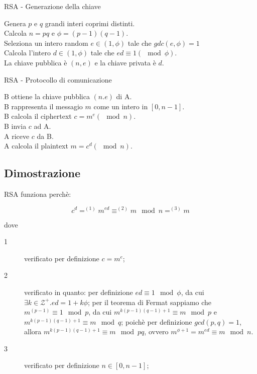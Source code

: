 \bigskip
\begin{algorithm}[H]
  \caption{RSA - Generazione della chiave}
  \label{alg:rsa-key-generation}
  \SetAlgoNoLine
  Genera $p$ e $q$ grandi interi coprimi distinti.\\
  Calcola $n=pq$ e $\phi=(p-1)(q-1)$.\\
  Seleziona un intero random $e \in (1,\phi)$ tale che $gdc(e,\phi)=1$\\
  Calcola l'intero $d \in (1,\phi)$ tale che $ed\equiv 1 (\mod \phi)$.\\
  La chiave pubblica è $(n,e)$ e la chiave privata è $d$.\\
\end{algorithm}

\bigskip
\begin{algorithm}[H]
  \SetAlgoNoLine
  \caption{RSA - Protocollo di comunicazione}
  \label{alg:rsa-protocol}
  B ottiene la chiave pubblica $(n.e)$ di A. \\
  B rappresenta il messagio $m$ come un intero in $[0,n-1]$. \\
  B calcola il ciphertext $c=m^{e}(\mod n)$. \\
  B invia $c$ ad A. \\
  A riceve $c$ da B. \\
  A calcola il plaintext $m=c^{d}(\mod n)$.
\end{algorithm}


\subsection{Dimostrazione}
RSA funziona perchè:

\begin{equation}
  c^{d} =^{(1)} m^{ed} \equiv^{(2)} m \mod n =^{(3)} m
\end{equation}

dove

\begin{description}
  \item[1] verificato per definizione $c=m^{e}$;

  \item[2] verificato in quanto:
    per definizione $ed\equiv 1 \mod \phi$, da cui $\exists k \in \mathcal{Z^{+}}.ed=1+k\phi$;
    per il teorema di Fermat sappiamo che $m^{(p-1)} \equiv 1 \mod p$, da cui $m^{k(p-1)(q-1)+1} \equiv m \mod p$ e $m^{k(p-1)(q-1)+1} \equiv m \mod q$;
    poichè per definizione $gcd(p,q)=1$, allora $m^{k(p-1)(q-1)+1} \equiv m \mod pq$, ovvero $m^{\phi +1} = m^{ed} \equiv m \mod n$.

  \item[3] verificato per definizione $n \in [0,n-1]$;
\end{description}

